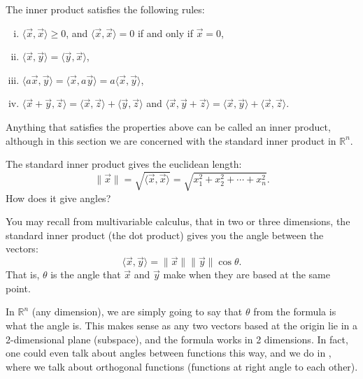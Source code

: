 The inner product satisfies the following rules:
\begin{enumerate}[(i)]
\item $\langle \vec{x} , \vec{x} \rangle \geq 0$, and
$\langle \vec{x} , \vec{x} \rangle = 0$ if and only if $\vec{x} = 0$,
\item $\langle \vec{x} , \vec{y} \rangle = \langle \vec{y} , \vec{x}
\rangle$,
\item $\langle a\vec{x} , \vec{y} \rangle =
\langle \vec{x} , a\vec{y} \rangle =
a \langle \vec{x} , \vec{y} \rangle$,
\item $\langle \vec{x} +  \vec{y} , \vec{z} \rangle =
\langle \vec{x} , \vec{z} \rangle +
\langle \vec{y} , \vec{z} \rangle$ and
$\langle \vec{x}, \vec{y} + \vec{z} \rangle =
\langle \vec{x} , \vec{y} \rangle +
\langle \vec{x} , \vec{z} \rangle$.
\end{enumerate}
Anything that satisfies the properties above can be called an inner
product, although in this section we are concerned with the
standard inner product in ${\mathbb{R}}^n$.

\medskip

The standard inner product gives the euclidean length:
\begin{equation*}
\lVert{\vec{x}}\rVert = \sqrt{\langle \vec{x}, \vec{x} \rangle}
= \sqrt{x_1^2 + x_2^2 + \cdots + x_n^2} .
\end{equation*}
How does it give angles?

You may recall from multivariable calculus, that in
two or three dimensions, the standard inner product (the dot product)
gives you the angle between the vectors:
\begin{equation*}
\langle \vec{x}, \vec{y} \rangle
=
\lVert{\vec{x}}\rVert \lVert{\vec{y}}\rVert \cos \theta.
\end{equation*}
That is, $\theta$ is the angle that $\vec{x}$ and $\vec{y}$ make
when they are based at the same point.

In ${\mathbb{R}}^n$ (any dimension), we are simply going to say that $\theta$
from the formula is what the angle is.
This makes sense as any two vectors based at the origin
lie in a 2-dimensional plane (subspace),
and the formula works in 2 dimensions.
In fact, one could even talk about angles between functions this way, and
we do in , where we talk about orthogonal functions
(functions at right angle to each other).

